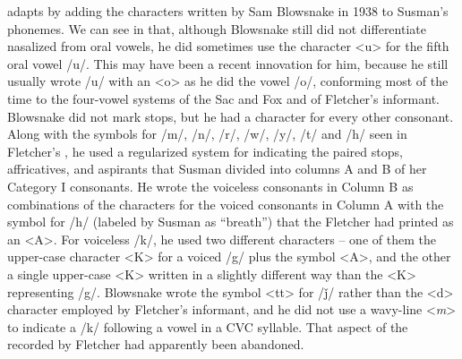 \documentclass[output=paper]{LSP/langsci}
\begin{document}
 adapts  by adding the  characters written by Sam Blowsnake in 1938 to Susman's  phonemes. We can see in  that, although Blowsnake still did not differentiate nasalized from oral vowels, he did sometimes use the character <u> for the fifth oral  vowel /u/. This may have been a recent innovation for him, because he still usually wrote /u/ with an <o> as he did the vowel /o/, conforming most of the time to the four-vowel  systems of the Sac and Fox and of Fletcher's informant. Blowsnake did not mark  stops, but he had a character for every other  consonant. Along with the symbols for /m/, /n/, /r/, /w/, /y/, /t/ and /h/ seen in Fletcher's , he used a regularized system for indicating the paired stops, affricatives, and aspirants that Susman divided into columns A and B of her Category I consonants. He wrote the voiceless consonants in Column B as combinations of the characters for the voiced consonants in Column A with the symbol for /h/ (labeled by Susman as ``breath'') that the Fletcher  had printed as an <A>. For voiceless /k/, he used two different characters -- one of them the upper-case character <K> for a voiced /g/ plus the symbol <A>, and the other a single upper-case <K> written in a slightly different way than the <K> representing /g/. Blowsnake wrote the  symbol <tt> for /\v{j}/ rather than the <d> character employed by Fletcher's informant, and he did not use a wavy-line <\textit{m}> to indicate a /k/ following a vowel in a CVC syllable. That aspect of the  recorded by Fletcher had apparently been abandoned.
\end{document}
